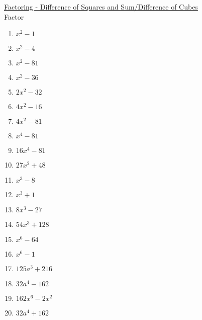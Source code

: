 \documentclass{article}
\begin{document}
\newpage
\underline{Factoring - Difference of Squares and Sum/Difference of Cubes} \\
Factor\\
\begin{enumerate}
\item $x^{2} - 1$
\item $x^{2} - 4$
\item $x^{2} - 81$
\item $x^{2} - 36$
\item $2x^{2} - 32$
\item $4x^{2} - 16$
\item $4x^{2} - 81$
\item $x^{4} - 81$
\item $16x^{4} - 81$
\item $27x^{2} + 48$
\item $x^{3} - 8$
\item $x^{3} + 1$
\item $8x^{3} - 27$
\item $54x^{3} + 128$
\item $x^{6} - 64$
\item $x^{6} - 1$
\item $125a^{3} + 216$
\item $32a^{4} - 162$
\item $162x^{6} -2x^{2}$
\item $32a^{4} + 162$
\end{enumerate}
\end{document}
